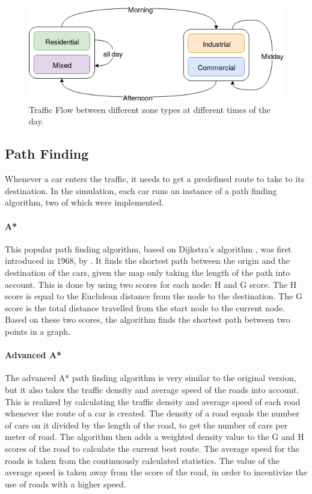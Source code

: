 \documentclass[11pt]{article}
\begin{document}
\begin{figure}
	\includegraphics[width=\linewidth]{img/zoned-traffic-flow.png}
	\caption{Traffic Flow between different zone types at different times of the day. \label{fig:zone-traffic-flow}}
\end{figure}

\subsection{Path Finding}
Whenever a car enters the traffic, it needs to get a predefined route to take to its destination. In the simulation, each car runs an instance of a path finding algorithm, two of which were implemented.

\paragraph{A*}
This popular path finding algorithm, based on Dijkstra’s algorithm \citep{dijkstra1959note}, was first introduced in 1968, by \citet{hart1968formal}. It finds the shortest path between the origin and the destination of the cars, given the map only taking the length of the path into account. This is done by using two scores for each node: H and G score. The H score is equal to the Euclidean distance from the node to the destination. The G score is the total distance travelled from the start node to the current node. Based on these two scores, the algorithm finds the shortest path between two points in a graph. 

\paragraph{Advanced A*}
The advanced A* path finding algorithm is very similar to the original version, but it also takes the traffic density and average speed of the roads into account. This is realized by calculating the traffic density and average speed of each road whenever the route of a car is created. The density of a road equals the number of cars on it divided by the length of the road, to get the number of cars per meter of road. The algorithm then adds a weighted density value to the G and H scores of the road to calculate the current best route. The average speed for the roads is taken from the continuously calculated statistics. The value of the average speed is taken away from the score of the road, in order to incentivize the use of roads with a higher speed.
\end{document}

